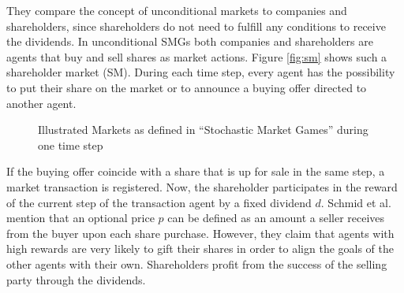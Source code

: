 They compare the concept of unconditional markets to companies and shareholders, since shareholders do not need to fulfill any conditions to receive the dividends. In unconditional SMGs both companies and shareholders are agents that buy and sell shares as market actions. Figure \ref{fig:sm} shows such a shareholder market (SM). During each time step, every agent has the possibility to put their share on the market or to announce a buying offer directed to another agent.

\begin{figure}[hpbt]
    \centering
    \hspace{0.01\textwidth}
    \caption[Illustrated Markets]{Illustrated Markets as defined in ``Stochastic Market Games'' \cite{scbe21} during one time step}
    \label{fig:multipic} %
\end{figure}

If the buying offer coincide with a share that is up for sale in the same step, a market transaction is registered. Now, the shareholder participates in the reward of the current step of the transaction agent by a fixed dividend $d$. Schmid et al. mention that an optional price $p$ can be defined as an amount a seller receives from the buyer upon each share purchase. However, they claim that agents with high rewards are very likely to gift their shares in order to align the goals of the other agents with their own. Shareholders profit from the success of the selling party through the dividends.

